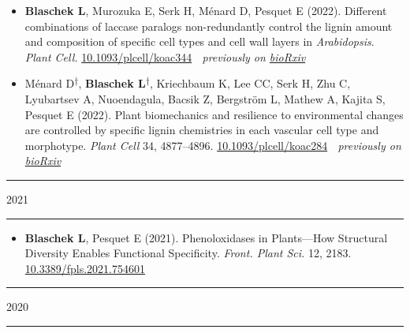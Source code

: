 \documentclass[11pt]{article}
\newcommand*{\xdash}[1][3em]{\rule[0.5ex]{#1}{0.55pt}}
\begin{document}
\vspace{-0.175cm}	
\begin{itemize}[label={},itemindent=-9pt,leftmargin=24pt]
	\itemsep-0.1cm
	\item \textbf{Blaschek L}, Murozuka E, Serk H, Ménard D, Pesquet E (2022). Different combinations of laccase paralogs non-redundantly control the lignin amount and composition of specific cell types and cell wall layers in \textit{Arabidopsis}. \textit{Plant Cell.} \href{https://doi.org/10.1093/plcell/koac344}{10.1093/plcell/koac344} \textemdash $\;$ \textit{previously on \href{https://doi.org/10.1101/2022.05.04.490011}{bioRxiv}}
	\item Ménard D\textsuperscript{$\dagger$}, \textbf{Blaschek L}\textsuperscript{$\dagger$}, Kriechbaum K, Lee CC, Serk H, Zhu C, Lyubartsev A, Nuoendagula, Bacsik Z, Bergström L, Mathew A, Kajita S, Pesquet E (2022). Plant biomechanics and resilience to environmental changes are controlled by specific lignin chemistries in each vascular cell type and morphotype. \textit{Plant Cell} 34, 4877–4896. \href{https://doi.org/10.1093/plcell/koac284}{10.1093/plcell/koac284} \textemdash $\;$ \textit{previously on \href{https://doi.org/10.1101/2021.06.12.447240}{bioRxiv}}
\end{itemize}

\hspace*{\fill} \xdash[6em] \large{\textsc{2021}} \xdash[6em] \hspace*{\fill} \normalsize

\vspace{-0.175cm}	
\begin{itemize}[label={},itemindent=-9pt,leftmargin=24pt]
	\itemsep-0.1cm
	\item \textbf{Blaschek L}, Pesquet E (2021). Phenoloxidases in Plants—How Structural Diversity Enables Functional Specificity. \textit{Front. Plant Sci.} 12, 2183.
	\href{https://doi.org/10.3389/fpls.2021.754601}{10.3389/fpls.2021.754601}
\end{itemize}

\hspace*{\fill} \xdash[6em] \large{\textsc{2020}} \xdash[6em] \hspace*{\fill} \normalsize
\end{document}
